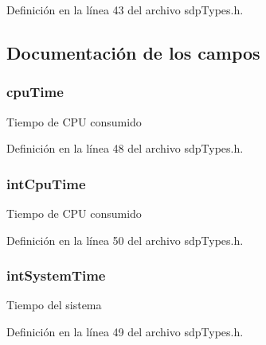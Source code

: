 Definición en la línea 43 del archivo sdp\+Types.\+h.



\subsection{Documentación de los campos}
\hypertarget{struct_s_t___t_i_m_e_r_ae4c31cb2b4477be7ae2f947073b3d770}{}
\subsubsection[{cpu\+Time}]{ cpu\+Time}\label{struct_s_t___t_i_m_e_r_ae4c31cb2b4477be7ae2f947073b3d770}
Tiempo de C\+P\+U consumido 

Definición en la línea 48 del archivo sdp\+Types.\+h.

\hypertarget{struct_s_t___t_i_m_e_r_a61dff6fa53638f76ef2f5c004a58992b}{}
\subsubsection[{int\+Cpu\+Time}]{ int\+Cpu\+Time}\label{struct_s_t___t_i_m_e_r_a61dff6fa53638f76ef2f5c004a58992b}
Tiempo de C\+P\+U consumido 

Definición en la línea 50 del archivo sdp\+Types.\+h.

\hypertarget{struct_s_t___t_i_m_e_r_a8c0fad2befd4574e6a7fae46124d5339}{}
\subsubsection[{int\+System\+Time}]{ int\+System\+Time}\label{struct_s_t___t_i_m_e_r_a8c0fad2befd4574e6a7fae46124d5339}
Tiempo del sistema 

Definición en la línea 49 del archivo sdp\+Types.\+h.

\hypertarget{struct_s_t___t_i_m_e_r_a4296c1722751cfeaf3d52cedf2bc212b}{}
